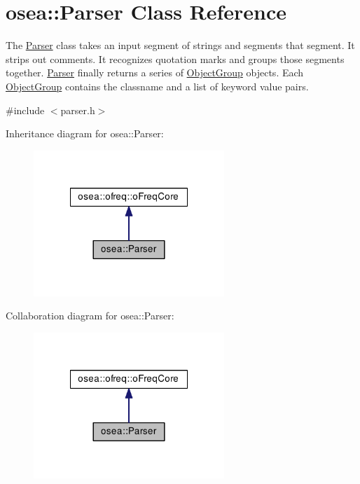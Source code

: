 \hypertarget{classosea_1_1_parser}{\section{osea\-:\-:Parser Class Reference}
\label{classosea_1_1_parser}
}


The \hyperlink{classosea_1_1_parser}{Parser} class takes an input segment of strings and segments that segment. It strips out comments. It recognizes quotation marks and groups those segments together. \hyperlink{classosea_1_1_parser}{Parser} finally returns a series of \hyperlink{classosea_1_1_object_group}{Object\-Group} objects. Each \hyperlink{classosea_1_1_object_group}{Object\-Group} contains the classname and a list of keyword value pairs.  




{\ttfamily \#include $<$parser.\-h$>$}



Inheritance diagram for osea\-:\-:Parser\-:\nopagebreak
\begin{figure}[H]
\begin{center}
\leavevmode
\includegraphics[width=204pt]{classosea_1_1_parser__inherit__graph}
\end{center}
\end{figure}


Collaboration diagram for osea\-:\-:Parser\-:\nopagebreak
\begin{figure}[H]
\begin{center}
\leavevmode
\includegraphics[width=204pt]{classosea_1_1_parser__coll__graph}
\end{center}
\end{figure}
